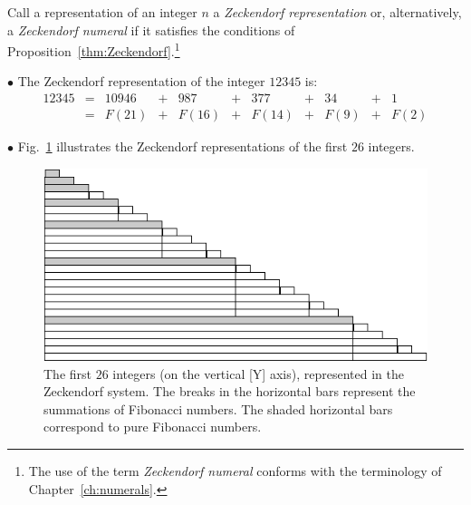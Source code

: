 \bigskip

\noindent {}
\bigskip


\noindent
Call a representation of an integer $n$ a {\it Zeckendorf representation} or, alternatively, a {\it Zeckendorf numeral} if it satisfies the conditions of Proposition~\ref{thm:Zeckendorf}.\footnote{The use of the term {\it Zeckendorf numeral} conforms with the terminology of Chapter~\ref{ch:numerals}.}

\medskip


\noindent $\bullet$
The Zeckendorf representation of the integer $12345$ is:
\[ \begin{array}{ccccccccccc}
12345 & =  & 10946 & + & 987    & +  &   377  & + & 34   & + & 1 \\
           & =  & F(21)  & + & F(16)  & +  & F(14) & + & F(9) & + & F(2)
\end{array} \]     

\medskip

\noindent $\bullet$
Fig.~\ref{fig:zeckendorf} illustrates the Zeckendorf representations of the first $26$ integers. 
\begin{figure}[h]
\begin{center}
        \includegraphics[scale=0.5]{FiguresArithmetic/Zeckendorf}
        \caption{The first $26$ integers (on the vertical [Y] axis), represented in the Zeckendorf system.  The breaks in the horizontal bars represent the summations of Fibonacci numbers.  The shaded horizontal bars correspond to pure Fibonacci numbers.}
\label{fig:zeckendorf}
\end{center}
\end{figure}

